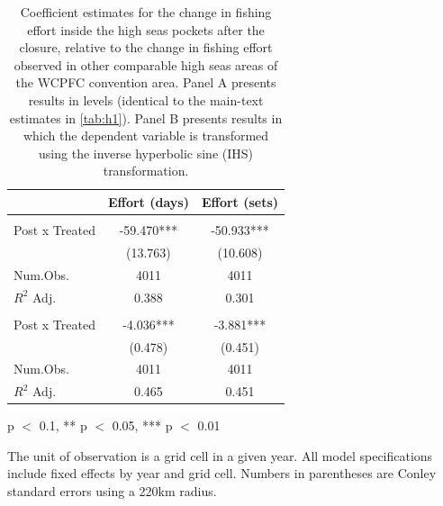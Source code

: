 \begin{table}
\centering
\begin{threeparttable}
\small
\caption{\label{tab:h1_twfe}Coefficient estimates for the change in fishing
             effort inside the high seas pockets after the closure, relative to the change in
             fishing effort observed in other comparable high seas areas of the WCPFC
             convention area. Panel A presents results in levels (identical to the
             main-text estimates in \autoref{tab:h1}). Panel B presents results in
             which the dependent variable is transformed using the inverse
             hyperbolic sine (IHS) transformation.}
\centering
\begin{tabular}[t]{lcc}
\toprule
  & Effort (days) & Effort (sets)\\
\midrule
\addlinespace[0.5em]
\multicolumn{3}{l}{\textit{A) Levels}}\\
\midrule \hspace{1em}Post x Treated & -59.470*** & -50.933***\\
\hspace{1em} & (13.763) & (10.608)\\
\hspace{1em}Num.Obs. & 4011 & \vphantom{1} 4011\\
\hspace{1em}$R^2$ Adj. & 0.388 & 0.301\\
\addlinespace[0.5em]
\multicolumn{3}{l}{\textit{B) Inverse-hyperbolic sine transformation}}\\
\midrule \hspace{1em}Post x Treated & -4.036*** & -3.881***\\
\hspace{1em} & (0.478) & (0.451)\\
\hspace{1em}Num.Obs. & 4011 & 4011\\
\hspace{1em}$R^2$ Adj. & 0.465 & 0.451\\
\bottomrule
\end{tabular}
\begin{tablenotes}
\small
\item * p $<$ 0.1, ** p $<$ 0.05, *** p $<$ 0.01
\item The unit of observation is a grid cell in a given year. All model specifications include fixed effects by year and grid cell. Numbers in parentheses are Conley standard errors using a 220km radius.
\end{tablenotes}
\end{threeparttable}
\end{table}
